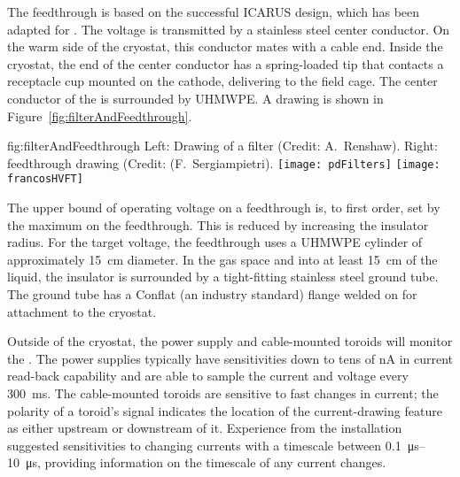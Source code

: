 The  feedthrough %
is based on the successful ICARUS design,  which has been adapted for .  The voltage is transmitted by a stainless steel center conductor.  On the warm side of the cryostat, this conductor mates with a cable end.  Inside the cryostat, the end of the center conductor has a spring-loaded tip that %
contacts a receptacle cup mounted on the cathode, delivering  to the field cage.  The center conductor of the \fdth is surrounded by UHMWPE. A drawing is shown in Figure~\ref{fig:filterAndFeedthrough}.

\begin{dunefigure}{fig:filterAndFeedthrough}
{Left:  Drawing of a  filter (Credit:  A.~Renshaw). Right:   feedthrough drawing (Credit:  (F.~Sergiampietri).}
\texttt{[image: pdFilters]}
\texttt{[image: francosHVFT]}
\end{dunefigure}

The upper bound of operating voltage on a feedthrough is, to first order, set by the maximum \efield{} on the feedthrough.  This \efield{} is reduced by increasing the insulator radius.  For the target voltage, the feedthrough uses a UHMWPE cylinder of approximately \SI{15}{cm} diameter.  In the gas space and into at least \SI{15}{\centi\meter} of the liquid, the insulator is surrounded by a tight-fitting stainless steel ground tube.  The ground tube has a %
Conflat (an industry standard) flange  welded on for attachment to the cryostat.


Outside of the cryostat, the  power supply and cable-mounted toroids will monitor the .    The power supplies %
typically have sensitivities down to tens of \si{\nano\ampere} in current read-back capability 
and are able to sample the current and voltage every \SI{300}{\ms}.  The cable-mounted toroids are sensitive to fast changes in current; %
the polarity of a toroid's signal %
indicates the location of the current-drawing feature as either upstream or downstream of it.  Experience from the  installation suggested sensitivities to changing currents with a timescale between \SIrange{0.1}{10}{\micro\s}, providing information on the timescale of any current changes.

